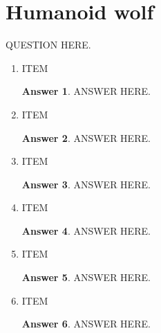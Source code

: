 \documentclass[a4paper]{article}
\renewcommand{\(}{\left(}
\renewcommand{\)}{\right)}
\theoremstyle{plain}
\theoremstyle{plain}
\theoremstyle{definition}
\newtheorem*{answer}{Answer}
\begin{document}
\section{Humanoid wolf}
QUESTION HERE.
\begin{enumerate}[label*=\roman*.,ref=\roman*]

\item ITEM
\begin{shaded}
\begin{answer}
ANSWER HERE.
\end{answer}
\end{shaded}

\item ITEM
\begin{shaded}
\begin{answer}
ANSWER HERE.
\end{answer}
\end{shaded}

\item ITEM
\begin{shaded}
\begin{answer}
ANSWER HERE.
\end{answer}
\end{shaded}

\item ITEM
\begin{shaded}
\begin{answer}
ANSWER HERE.
\end{answer}
\end{shaded}

\item ITEM
\begin{shaded}
\begin{answer}
ANSWER HERE.
\end{answer}
\end{shaded}

\item ITEM
\begin{shaded}
\begin{answer}
ANSWER HERE.
\end{answer}
\end{shaded}

\end{enumerate}
\end{document}
